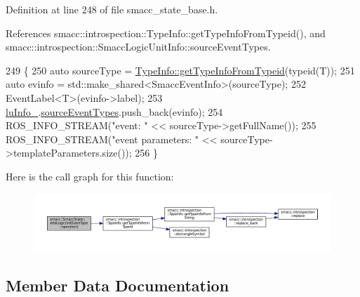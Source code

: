 Definition at line 248 of file smacc\+\_\+state\+\_\+base.\+h.



References smacc\+::introspection\+::\+Type\+Info\+::get\+Type\+Info\+From\+Typeid(), and smacc\+::introspection\+::\+Smacc\+Logic\+Unit\+Info\+::source\+Event\+Types.


\begin{DoxyCode}
249     \{
250       \textcolor{keyword}{auto} sourceType = \hyperlink{classsmacc_1_1introspection_1_1TypeInfo_a09ec2f3f94a8f1fc82ae250216c38d47}{TypeInfo::getTypeInfoFromTypeid}(\textcolor{keyword}{typeid}(T));
251       \textcolor{keyword}{auto} evinfo = std::make\_shared<SmaccEventInfo>(sourceType);
252       EventLabel<T>(evinfo->label);
253       \hyperlink{structsmacc_1_1SmaccState_1_1AddLogicUnitEventType_a31c27ea945cd0127080c0bae872c028e}{luInfo\_}.\hyperlink{structsmacc_1_1introspection_1_1SmaccLogicUnitInfo_add386e83d888a7819c0132a75942fa5d}{sourceEventTypes}.push\_back(evinfo);
254       ROS\_INFO\_STREAM(\textcolor{stringliteral}{"event: "} << sourceType->getFullName());
255       ROS\_INFO\_STREAM(\textcolor{stringliteral}{"event parameters: "} << sourceType->templateParameters.size());
256     \}
\end{DoxyCode}


Here is the call graph for this function\+:
\nopagebreak
\begin{figure}[H]
\begin{center}
\leavevmode
\includegraphics[width=350pt]{structsmacc_1_1SmaccState_1_1AddLogicUnitEventType_a8ed7e96e4922fbc8097a6ff078d70150_cgraph}
\end{center}
\end{figure}




\subsection{Member Data Documentation}
